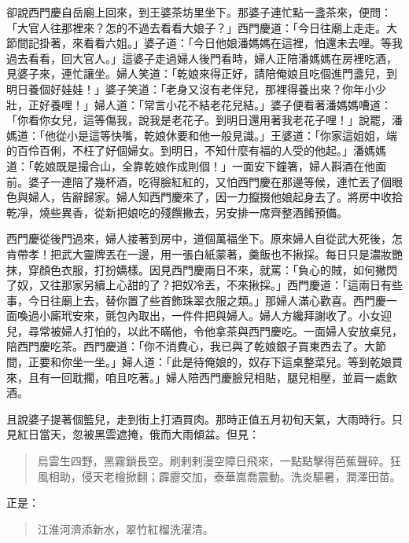 卻說西門慶自岳廟上回來，到王婆茶坊里坐下。那婆子連忙點一盞茶來，便問：「大官人往那裡來？怎的不過去看看大娘子？」西門慶道：「今日往廟上走走。大節間記掛著，來看看六姐。」婆子道：「今日他娘潘媽媽在這裡，怕還未去哩。等我過去看看，回大官人。」這婆子走過婦人後門看時，婦人正陪潘媽媽在房裡吃酒，見婆子來，連忙讓坐。婦人笑道：「乾娘來得正好，請陪俺娘且吃個進門盞兒，到明日養個好娃娃！」婆子笑道：「老身又沒有老伴兒，那裡得養出來？你年小少壯，正好養哩！」婦人道：「常言小花不結老花兒結。」婆子便看著潘媽媽嘈道：「你看你女兒，這等傷我，說我是老花子。到明日還用著我老花子哩！」說罷，潘媽道：「他從小是這等快嘴，乾娘休要和他一般見識。」王婆道：「你家這姐姐，端的百伶百俐，不枉了好個婦女。到明日，不知什麼有福的人受的他起。」潘媽媽道：「乾娘既是撮合山，全靠乾娘作成則個！」一面安下鐘箸，婦人斟酒在他面前。婆子一連陪了幾杯酒，吃得臉紅紅的，又怕西門慶在那邊等候，連忙丟了個眼色與婦人，告辭歸家。婦人知西門慶來了，因一力攛掇他娘起身去了。將房中收拾乾凈，燒些異香，從新把娘吃的殘饌撇去，另安排一席齊整酒餚預備。

西門慶從後門過來，婦人接著到房中，道個萬福坐下。原來婦人自從武大死後，怎肯帶孝！把武大靈牌丟在一邊，用一張白紙蒙著，羹飯也不揪採。每日只是濃妝艷抹，穿顏色衣服，打扮嬌樣。因見西門慶兩日不來，就罵：「負心的賊，如何撇閃了奴，又往那家另續上心甜的了？把奴冷丟，不來揪採。」西門慶道：「這兩日有些事，今日往廟上去，替你置了些首飾珠翠衣服之類。」那婦人滿心歡喜。西門慶一面喚過小廝玳安來，氈包內取出，一件件把與婦人。婦人方纔拜謝收了。小女迎兒，尋常被婦人打怕的，以此不瞞他，令他拿茶與西門慶吃。一面婦人安放桌兒，陪西門慶吃茶。西門慶道：「你不消費心，我已與了乾娘銀子買東西去了。大節間，正要和你坐一坐。」婦人道：「此是待俺娘的，奴存下這桌整菜兒。等到乾娘買來，且有一回耽擱，咱且吃著。」婦人陪西門慶臉兒相貼，腿兒相壓，並肩一處飲酒。

且說婆子提著個籃兒，走到街上打酒買肉。那時正值五月初旬天氣，大雨時行。只見紅日當天，忽被黑雲遮掩，俄而大雨傾盆。但見：
\begin{quote}
烏雲生四野，黑霧鎖長空。刷剌剌漫空障日飛來，一點點擊得芭蕉聲碎。狂風相助，侵天老檜掀翻；霹靂交加，泰華嵩喬震動。洗炎驅暑，潤澤田苗。
\end{quote}
正是：
\begin{quote}
江淮河濟添新水，翠竹紅榴洗濯清。
\end{quote}

